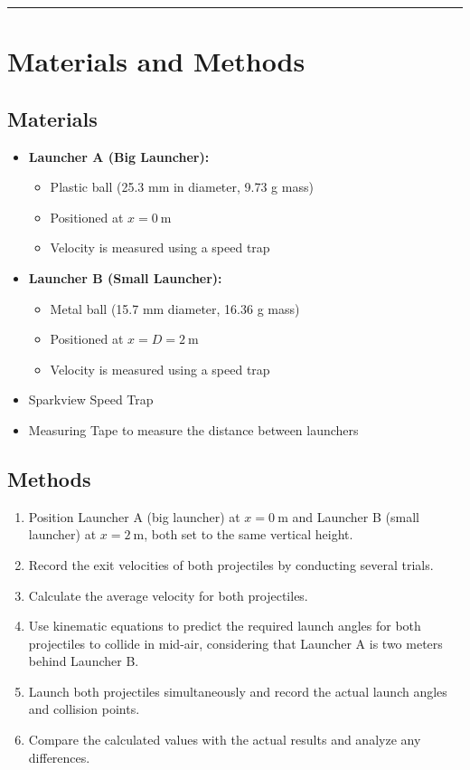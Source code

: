 \documentclass[12pt]{article}
\begin{document}
\noindent\rule{\textwidth}{0.5pt} %



\section{Materials and Methods}

\subsection{Materials}
\begin{itemize}
    \item \textbf{Launcher A (Big Launcher):}
    \begin{itemize}
        \item Plastic ball (25.3 mm in diameter, 9.73 g mass)
        \item Positioned at $x = 0 \ \text{m}$
        \item Velocity is measured using a speed trap
    \end{itemize}
    \item \textbf{Launcher B (Small Launcher):}
    \begin{itemize}
        \item Metal ball (15.7 mm diameter, 16.36 g mass)
        \item Positioned at $x = D = 2 \ \text{m}$
        \item Velocity is measured using a speed trap
    \end{itemize}
    \item Sparkview Speed Trap
    \item Measuring Tape to measure the distance between launchers
\end{itemize}

\subsection{Methods}
\begin{enumerate}
    \item Position Launcher A (big launcher) at $x = 0 \ \text{m}$ and Launcher B (small launcher) at $x = 2 \ \text{m}$, both set to the same vertical height.
    \item Record the exit velocities of both projectiles by conducting several trials.
    \item Calculate the average velocity for both projectiles.
    \item Use kinematic equations to predict the required launch angles for both projectiles to collide in mid-air, considering that Launcher A is two meters behind Launcher B.
    \item Launch both projectiles simultaneously and record the actual launch angles and collision points.
    \item Compare the calculated values with the actual results and analyze any differences.
\end{enumerate}
\end{document}
